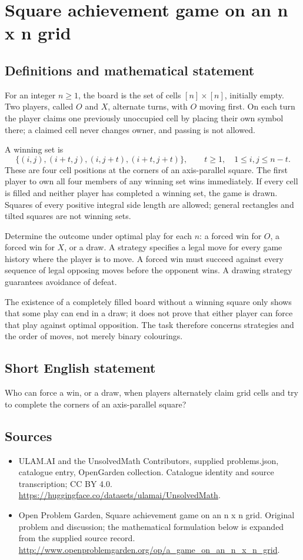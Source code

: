 \documentclass[11pt,a4paper]{article}
\begin{document}
\section*{Square achievement game on an n x n grid}\label{statement}

\subsection{Definitions and mathematical statement}
For an integer $n\ge1$, the board is the set of cells
$[n]\times[n]$, initially empty. Two players, called $O$ and $X$, alternate
turns, with $O$ moving first. On each turn the player claims one previously
unoccupied cell by placing their own symbol there; a claimed cell never
changes owner, and passing is not allowed.

A winning set is
\[
 \{(i,j),(i+t,j),(i,j+t),(i+t,j+t)\},
 \qquad t\ge1,\quad 1\le i,j\le n-t.
\]
These are four cell positions at the corners of an axis-parallel square.
The first player to own all four members of any winning set wins immediately.
If every cell is filled and neither player has completed a winning set,
the game is drawn. Squares of every positive integral side length are
allowed; general rectangles and tilted squares are not winning sets.

Determine the outcome under optimal play for each $n$: a forced win for
$O$, a forced win for $X$, or a draw. A strategy specifies a legal move
for every game history where the player is to move. A forced win must
succeed against every sequence of legal opposing moves before the opponent
wins. A drawing strategy guarantees avoidance of defeat.

The existence of a completely filled board without a winning square only
shows that some play can end in a draw; it does not prove that either
player can force that play against optimal opposition. The task therefore
concerns strategies and the order of moves, not merely binary colourings.
\subsection{Short English statement}
Who can force a win, or a draw, when players alternately claim grid cells and try to complete the corners of an axis-parallel square?
\subsection{Sources}
\begin{itemize}
\item[S1] ULAM.AI and the UnsolvedMath Contributors, supplied problems.json, catalogue entry, OpenGarden collection. Catalogue identity and source transcription; CC BY 4.0.
\url{https://huggingface.co/datasets/ulamai/UnsolvedMath}.
\item[S2] Open Problem Garden, Square achievement game on an n x n grid. Original problem and discussion; the mathematical formulation below is expanded from the supplied source record.
\url{http://www.openproblemgarden.org/op/a_game_on_an_n_x_n_grid}.
\end{itemize}
\end{document}
